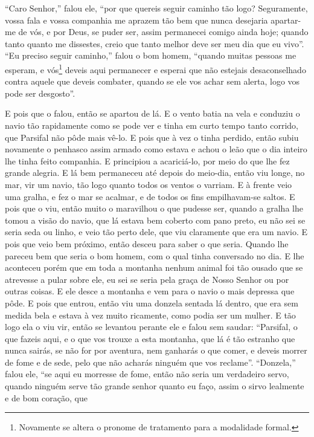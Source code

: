 “Caro Senhor,” falou ele, “por que quereis seguir caminho tão logo?
Seguramente, vossa fala e vossa companhia me aprazem tão bem que nunca
desejaria apartar-me de vós, e por Deus, se puder ser, assim permanecei comigo
ainda hoje; quando tanto quanto me dissestes, creio que tanto melhor deve ser
meu dia que eu vivo”. “Eu preciso seguir caminho,” falou o bom homem, “quando
muitas pessoas me esperam, e vós\footnote{ Novamente se altera o pronome de
tratamento para a modalidade formal.}  deveis aqui permanecer e
esperai que não estejais desaconselhado contra aquele que deveis combater,
quando se ele vos achar sem alerta, logo vos pode ser desgosto”.

 E pois que o falou, então se apartou de lá. E o vento batia na vela e
conduziu o navio tão rapidamente como se pode ver e tinha em curto tempo tanto
corrido, que Parsifal não pôde mais vê-lo. E pois que à vez o tinha perdido,
então subiu novamente o penhasco assim armado como estava e achou o leão que o
dia inteiro lhe tinha feito companhia. E principiou a acariciá-lo, por meio do
que lhe fez grande alegria. E lá bem permaneceu até depois do meio-dia, então
viu longe, no mar, vir um navio, tão logo quanto todos os ventos o varriam. E à
frente veio uma gralha, e fez o mar se acalmar, e de todos os fins
empilhavam-se saltos. E pois que o viu, então muito o maravilhou o que pudesse
ser, quando a gralha lhe tomou a visão do navio, que lá estava bem coberto com
pano preto, eu não sei se seria seda ou linho,  e veio tão perto dele,
que viu claramente que era um navio. E pois que veio bem próximo, então desceu
para saber o que seria. Quando lhe pareceu bem que seria o bom homem, com o
qual tinha conversado no dia. E lhe aconteceu porém que em toda a montanha
nenhum animal foi tão ousado que se atrevesse a pular sobre ele, eu sei se
seria pela graça de Nosso Senhor ou por outras coisas. E ele desce a montanha e
vem para o navio o mais depressa que pôde. E pois que entrou, então viu uma
donzela sentada lá dentro, que era sem medida bela e estava à vez muito
ricamente, como podia ser um mulher. E tão logo ela o viu vir, então se
levantou perante ele e falou sem saudar: “Parsifal, o que fazeis aqui, e o que
vos trouxe a esta montanha, que lá é tão estranho que nunca sairás, se não for
por aventura, nem ganharás o que comer, e deveis morrer de fome e de sede, pelo
que não acharás ninguém que vos reclame”. “Donzela,” falou ele, “se aqui eu
morresse de fome, então não seria um verdadeiro servo, quando ninguém serve tão
grande senhor quanto eu faço,  assim o sirvo lealmente e de bom coração, que
